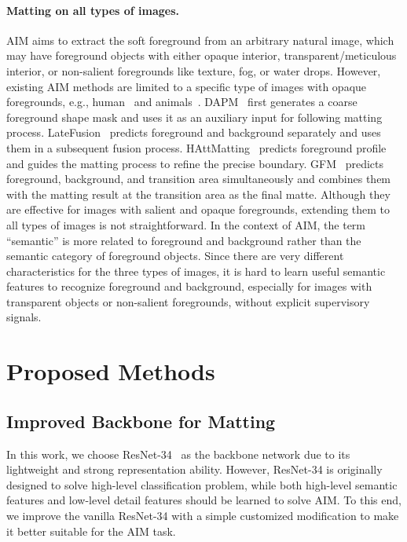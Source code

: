 \documentclass{article}
\begin{document}
\paragraph{Matting on all types of images.}AIM aims to extract the soft foreground from an arbitrary natural image, which may have foreground objects with either opaque interior, transparent/meticulous interior, or non-salient foregrounds like texture, fog, or water drops. However, existing AIM methods are limited to a specific type of images with opaque foregrounds, e.g., human~\cite{shen2016deep,chen2018semantic,zhang2019late,li2021privacypreserving,MODNet} and animals~\cite{gfm}. DAPM~\cite{shen2016deep} first generates a coarse foreground shape mask and uses it as an auxiliary input for following matting process. LateFusion~\cite{zhang2019late} predicts foreground and background separately and uses them in a subsequent fusion process. HAttMatting~\cite{Qiao_2020_CVPR} predicts foreground profile and guides the matting process to refine the precise boundary. GFM~\cite{gfm} predicts foreground, background, and transition area simultaneously and combines them with the matting result at the transition area as the final matte. Although they are effective for images with salient and opaque foregrounds, extending them to all types of images is not straightforward. In the context of AIM, the term ``semantic'' is more related to foreground and background rather than the semantic category of foreground objects. Since there are very different characteristics for the three types of images, it is hard to learn useful semantic features to recognize foreground and background, especially for images with transparent objects or non-salient foregrounds, without explicit supervisory signals.



\section{Proposed Methods}

\subsection{Improved Backbone for Matting}

In this work, we choose ResNet-34~\cite{he2016deep} as the backbone network due to its lightweight and strong representation ability. However, ResNet-34 is originally designed to solve high-level classification problem, while both high-level semantic features and low-level detail features should be learned to solve AIM. To this end, we improve the vanilla ResNet-34 with a simple customized modification to make it better suitable for the AIM task. 
\end{document}
